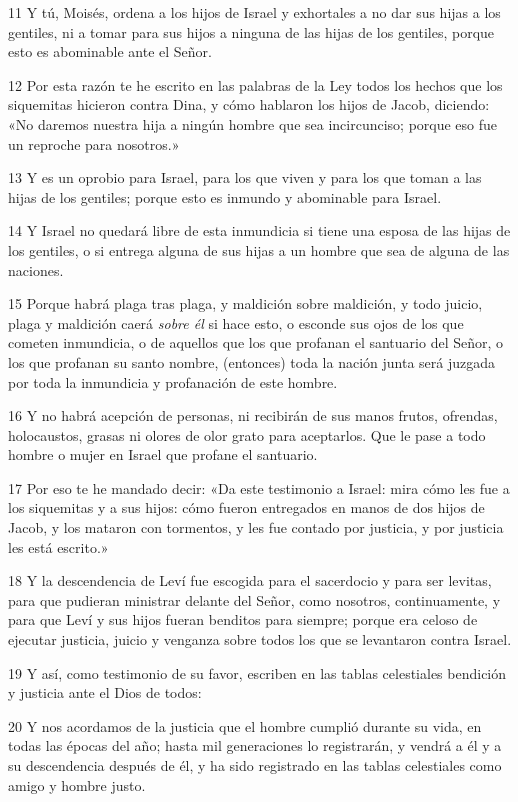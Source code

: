 \par 11 Y tú, Moisés, ordena a los hijos de Israel y exhortales a no dar sus hijas a los gentiles, ni a tomar para sus hijos a ninguna de las hijas de los gentiles, porque esto es abominable ante el Señor.
\par 12 Por esta razón te he escrito en las palabras de la Ley todos los hechos que los siquemitas hicieron contra Dina, y cómo hablaron los hijos de Jacob, diciendo: «No daremos nuestra hija a ningún hombre que sea incircunciso; porque eso fue un reproche para nosotros.»
\par 13 Y es un oprobio para Israel, para los que viven y para los que toman a las hijas de los gentiles; porque esto es inmundo y abominable para Israel.
\par 14 Y Israel no quedará libre de esta inmundicia si tiene una esposa de las hijas de los gentiles, o si entrega alguna de sus hijas a un hombre que sea de alguna de las naciones.
\par 15 Porque habrá plaga tras plaga, y maldición sobre maldición, y todo juicio, plaga y maldición caerá \textit{sobre él} si hace esto, o esconde sus ojos de los que cometen inmundicia, o de aquellos que los que profanan el santuario del Señor, o los que profanan su santo nombre, (entonces) toda la nación junta será juzgada por toda la inmundicia y profanación de este hombre.
\par 16 Y no habrá acepción de personas, ni recibirán de sus manos frutos, ofrendas, holocaustos, grasas ni olores de olor grato para aceptarlos. Que le pase a todo hombre o mujer en Israel que profane el santuario.
\par 17 Por eso te he mandado decir: «Da este testimonio a Israel: mira cómo les fue a los siquemitas y a sus hijos: cómo fueron entregados en manos de dos hijos de Jacob, y los mataron con tormentos, y les fue contado por justicia, y por justicia les está escrito.»
\par 18 Y la descendencia de Leví fue escogida para el sacerdocio y para ser levitas, para que pudieran ministrar delante del Señor, como nosotros, continuamente, y para que Leví y sus hijos fueran benditos para siempre; porque era celoso de ejecutar justicia, juicio y venganza sobre todos los que se levantaron contra Israel.
\par 19 Y así, como testimonio de su favor, escriben en las tablas celestiales bendición y justicia ante el Dios de todos:
\par 20 Y nos acordamos de la justicia que el hombre cumplió durante su vida, en todas las épocas del año; hasta mil generaciones lo registrarán, y vendrá a él y a su descendencia después de él, y ha sido registrado en las tablas celestiales como amigo y hombre justo.
